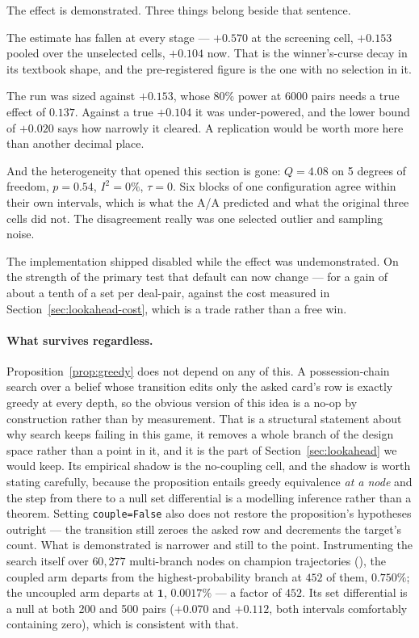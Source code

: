 \documentclass[11pt,a4paper]{article}
\begin{document}
The effect is demonstrated. Three things belong beside that sentence.

The estimate has fallen at every stage --- $+0.570$ at the screening cell,
$+0.153$ pooled over the unselected cells, $+0.104$ now. That is the
winner's-curse decay in its textbook shape, and the pre-registered figure is the
one with no selection in it.

The run was sized against $+0.153$, whose 80\% power at 6000 pairs needs a true
effect of $0.137$. Against a true $+0.104$ it was under-powered, and the lower
bound of $+0.020$ says how narrowly it cleared. A replication would be worth
more here than another decimal place.

And the heterogeneity that opened this section is gone: $Q = 4.08$ on 5 degrees
of freedom, $p = 0.54$, $I^2 = 0\%$, $\tau = 0$. Six blocks of one configuration
agree within their own intervals, which is what the A/A predicted and what the
original three cells did not. The disagreement really was one selected outlier
and sampling noise.

The implementation shipped disabled while the effect was undemonstrated. On the
strength of the primary test that default can now change --- for a gain of about
a tenth of a set per deal-pair, against the cost measured in
Section~\ref{sec:lookahead-cost}, which is a trade rather than a free win.

\paragraph{What survives regardless.} Proposition~\ref{prop:greedy} does not
depend on any of this. A possession-chain search over a belief whose transition
edits only the asked card's row is exactly greedy at every depth, so the obvious
version of this idea is a no-op by construction rather than by measurement. That
is a structural statement about why search keeps failing in this game, it
removes a whole branch of the design space rather than a point in it, and it is
the part of Section~\ref{sec:lookahead} we would keep. Its empirical shadow is the
no-coupling cell, and the shadow is worth stating carefully, because the
proposition entails greedy equivalence \emph{at a node} and the step from there
to a null set differential is a modelling inference rather than a theorem.
Setting \texttt{couple=False} also does not restore the proposition's hypotheses
outright --- the transition still zeroes the asked row and decrements the
target's count. What is demonstrated is narrower and still to the point. Instrumenting the
search itself over $60{,}277$ multi-branch nodes on champion trajectories
(), the coupled arm departs from the
highest-probability branch at $452$ of them, $0.750\%$; the uncoupled arm
departs at $\mathbf{1}$, $0.0017\%$ --- a factor of $452$. Its set differential
is a null at both 200 and 500 pairs ($+0.070$ and $+0.112$, both intervals
comfortably containing zero), which is consistent with that.
\end{document}
